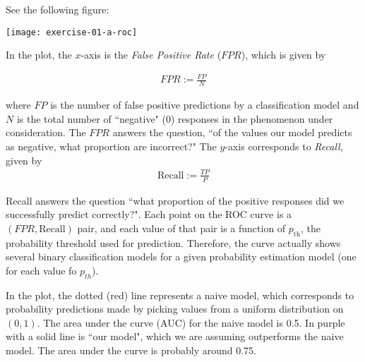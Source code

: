 \documentclass[12pt]{article}
\begin{document}

\begin{enumerate}


See the following figure:

\begin{center}
	\texttt{[image: exercise-01-a-roc]}
\end{center}

In the plot, the $x$-axis is the \textit{False Positive Rate} ($FPR$),
which is given by

\begin{align*}
	FPR := \frac{FP}{N}
\end{align*}

where $FP$ is the number of false positive predictions by a classification model
and $N$ is the total number of ``negative" (0) responses in the phenomenon under
consideration. The $FPR$ answers the question, ``of the values our model predicts
as negative, what proportion are incorrect?" The $y$-axis corresponds to
\textit{Recall}, given by
\begin{align*}
	\text{Recall} := \frac{TP}{P}
\end{align*}

Recall answers the question ``what proportion of the positive responses did
we successfully predict correctly?". Each point on the ROC curve is a $(FPR, \text{Recall})$
pair, and each value of that pair is a function of $p_{\text{th}}$, the probability
threshold used for prediction. Therefore, the curve actually shows several
binary classification models for a given probability estimation model (one for
each value fo $p_{th}$).

In the plot, the dotted (red) line represents a
naive model, which corresponds to probability predictions made by picking
values from a uniform distribution on $(0, 1)$. The area under the curve (AUC) for the
naive model is 0.5. In purple with a solid line is ``our model", which
we are assuming outperforms the naive model. The area under the curve is
probably around 0.75.



\end{enumerate}
\end{document}
